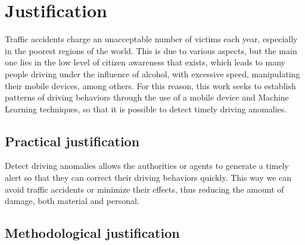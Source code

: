 \section{Justification}

Traffic accidents charge an unacceptable number of victims each year, especially in the poorest regions of the world. This is due to various aspects, but the main one lies in the low level of citizen awareness that exists, which leads to many people driving under the influence of alcohol, with excessive speed, manipulating their mobile devices, among others. For this reason, this work seeks to establish patterns of driving behaviors through the use of a mobile device and Machine Learning techniques, so that it is possible to detect timely driving anomalies.

\subsection{Practical justification}

Detect driving anomalies allows the authorities or agents to generate a timely alert so that they can correct their driving behaviors quickly. This way we can avoid traffic accidents or minimize their effects, thus reducing the amount of damage, both material and personal.

\subsection{Methodological justification}

